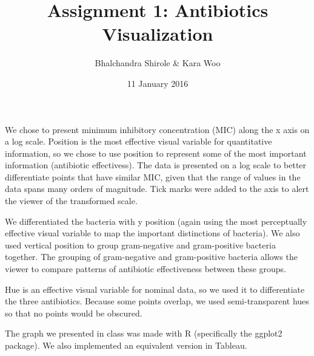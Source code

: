 \documentclass{hw}
\author{Bhalchandra Shirole \& Kara Woo}
\date{11 January 2016}
\title{Assignment 1: Antibiotics Visualization}
\begin{document}
\maketitle
We chose to present minimum inhibitory concentration (MIC) along the x axis on a log scale. Position is the most effective visual variable for quantitative information, so we chose to use position to represent some of the most important information (antibiotic effectivess). The data is presented on a log scale to better differentiate points that have similar MIC, given that the range of values in the data spans many orders of magnitude. Tick marks were added to the axis to alert the viewer of the transformed scale.

We differentiated the bacteria with y position (again using the most perceptually effective visual variable to map the important distinctions of bacteria). We also used vertical position to group gram-negative and gram-positive bacteria together. The grouping of gram-negative and gram-positive bacteria allows the viewer to compare patterns of antibiotic effectiveness between these groups.  

Hue is an effective visual variable for nominal data, so we used it to differentiate the three antibiotics. Because some points overlap, we used semi-transparent hues so that no points would be obscured.

The graph we presented in class was made with R (specifically the ggplot2 package). We also implemented an equivalent version in Tableau.
\end{document}
